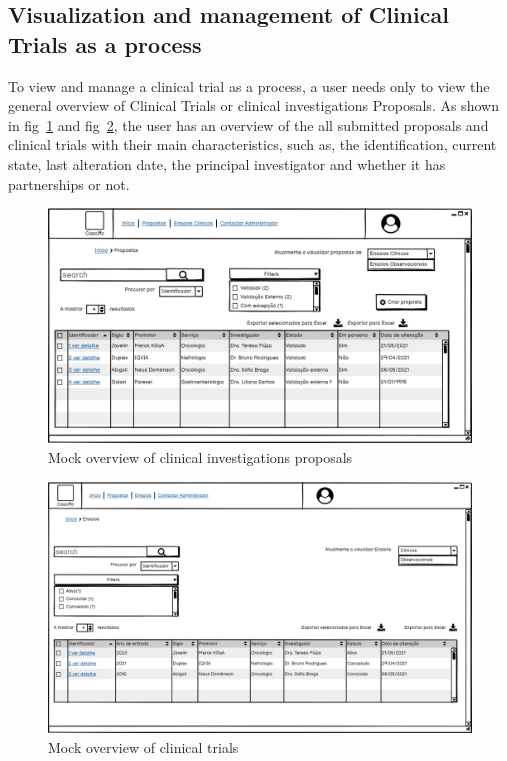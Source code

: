 \subsection{Visualization and management of Clinical Trials as a process}
To view and manage a clinical trial as a process, a user needs only to view the general overview of Clinical Trials or clinical investigations Proposals.
As shown in fig~\ref{fig:propostas} and fig~\ref{fig:ensaios}, the user has an overview of the all submitted proposals and clinical trials with their main characteristics, such as, the identification, current state, last alteration date, the principal investigator and whether it has partnerships or not.

\begin{figure}
    \centering
    \includegraphics{images/proposals.png}
    \caption{Mock overview of clinical investigations proposals}
    \label{fig:propostas}
\end{figure}

\begin{figure}
    \centering
    \includegraphics{images/ensaios.png}
    \caption{Mock overview of clinical trials}
    \label{fig:ensaios}
\end{figure}


